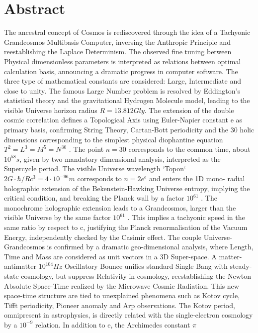 
\chapter*{Abstract}
\vspace{-40pt}
The ancestral concept of Cosmos is rediscovered through the idea of a Tachyonic
Grandcosmos Multibasis Computer, inversing the Anthropic Principle and reestablishing
the Laplace Determinism. The observed fine tuning between Physical dimensionless
parameters is interpreted as relations between optimal calculation basis, announcing a
dramatic progress in computer software. The three type of mathematical constants are
considered: Large, Intermediate and close to unity. The famous Large Number problem is
resolved by Eddington's statistical theory and the gravitational Hydrogen Molecule model,
leading to the visible Universe horizon radius $ R = 13.812 Gly $. The extension of
the double cosmic correlation defines a Topological Axis using Euler-Napier constant e as
primary basis, confirming String Theory, Cartan-Bott periodicity and the 30 holic
dimensions corresponding to the simplest physical diophantine equation $T^2 = L^3 = M^5 =
N^{30}$ . The point $n = 30$ corresponds to the common time, about $10^{58} s$, given by two
mandatory dimensional analysis, interpreted as the Supercycle period. The visible Universe
wavelength `Topon` $2G \cdot \hbar / Rc^{3} = 4 \cdot 10^{-96} m$ corresponds to $n = 2e^{e}$ and enters the 1D mono-
radial holographic extension of the Bekenstein-Hawking Universe entropy, implying the
critical condition, and breaking the Planck wall by a factor $10^{61}$ . The monochrome
holographic extension leads to a Grandcosmos, larger than the visible Universe by the
same factor $10^{61}$ . This implies a tachyonic speed in the same ratio by respect to c, justifying
the Planck renormalisation of the Vacuum Energy, independently checked by the Casimir
effect. The couple Universe-Grandcosmos is confirmed by a dramatic geo-dimensional
analysis, where Length, Time and Mass are considered as unit vectors in a 3D Super-space.
A matter-antimatter $ 10^{104} Hz$ Oscillatory Bounce unifies standard Single Bang with steady-
state cosmology, but suppress Relativity in cosmology, reestablishing the Newton Absolute
Space-Time realized by the Microwave Cosmic Radiation. This new space-time structure are
tied to unexplained phenomena such as Kotov cycle, Tifft periodicity, Pioneer anomaly and
Arp observations. The Kotov period, omnipresent in astrophysics, is directly related with the
single-electron cosmology by a $10^{-9}$ relation. In addition to e, the Archimedes constant $\pi$
